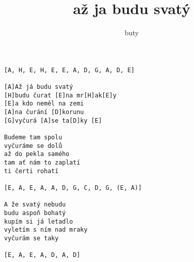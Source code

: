 \author{buty}
\title{až ja budu svatý}
\maketitle
\begin{verbatim}
[A, H, E, H, E, E, A, D, G, A, D, E]

[A]Až já budu svatý 
[H]budu čurat [E]na mr[H]ak[E]y 
[E]a kdo neměl na zemi 
[A]na čurání [D]korunu 
[G]vyčurá [A]se ta[D]ky [E]

Budeme tam spolu 
vyčuráme se dolů 
až do pekla samého 
tam ať nám to zaplatí 
ti čerti rohatí 

[E, A, E, A, A, D, G, C, D, G, (E, A)]

A že svatý nebudu 
budu aspoň bohatý 
kupím si já letadlo 
vyletím s ním nad mraky 
vyčurám se taky 

[E, A, E, A, D, A, D]
\end{verbatim}
